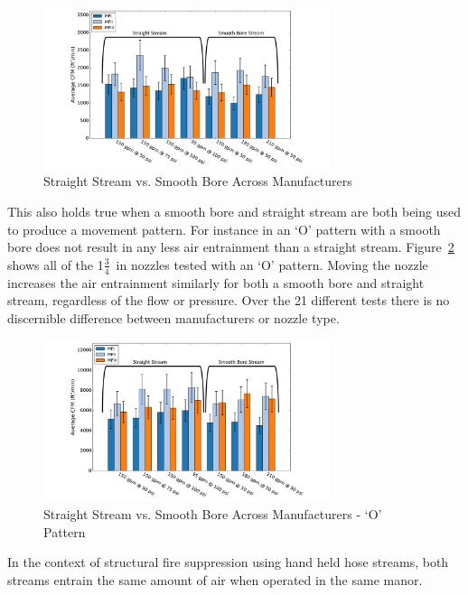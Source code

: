 \documentclass[12pt,oneside]{book}
\begin{document}
\begin{figure}[H]
\centering
\includegraphics[width=0.75\textwidth]{Figures/Air_Entrainment/SB_SS_All_Manufacture.pdf}
\caption{Straight Stream vs. Smooth Bore Across Manufacturers}
\label{fig:SS_vs_SB}
\end{figure}

This also holds true when a smooth bore and straight stream are both being used to produce a movement pattern. For instance in an `O' pattern with a smooth bore does not result in any less air entrainment than a straight stream. Figure~\ref{fig:SS_vs_SB_O} shows all of the 1$\frac{3}{4}$~in nozzles tested with an `O' pattern. Moving the nozzle increases the air entrainment similarly for both a smooth bore and straight stream, regardless of the flow or pressure. Over the 21 different tests there is no discernible difference between manufacturers or nozzle type. 

\begin{figure}[H]
\centering
\includegraphics[width=0.75\textwidth]{Figures/Air_Entrainment/SB_SS_All_O_Manufacture.pdf}
\caption{Straight Stream vs. Smooth Bore Across Manufacturers - `O' Pattern}
\label{fig:SS_vs_SB_O}
\end{figure}

In the context of structural fire suppression using hand held hose streams, both streams entrain the same amount of air when operated in the same manor. 
\end{document}
